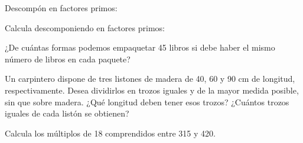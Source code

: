 \documentclass[addpoints,spanish, 12pt,a4paper]{exam}
\renewcommand*\half{.5}
\begin{document}
\begin{questions}

    \question[1] Descompón en factores primos:

    \question[1\half] Calcula descomponiendo en factores primos:

    \question[1\half] ¿De cuántas formas podemos empaquetar 45 libros si debe haber el mismo número de libros en cada paquete?\vspace{20pt}\vspace{20pt}\vspace{20pt}

    \question[2] Un carpintero dispone de tres listones de madera de 40, 60 y 90 cm de longitud, respectivamente. Desea dividirlos en trozos iguales y de la mayor medida posible, sin que sobre madera. ¿Qué longitud deben tener esos trozos? ¿Cuántos trozos iguales de cada listón se obtienen?\vspace{20pt}\vspace{20pt}\vspace{20pt}

    \question[1\half] Calcula los múltiplos de 18 comprendidos entre 315 y 420.

\end{questions}
\end{document}
